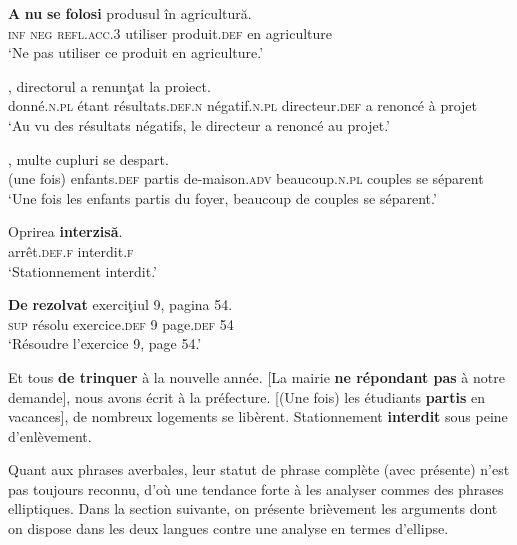 \ea
\ea
\gll   \textbf{A}  \textbf{nu} \textbf{se}  \textbf{folosi}  produsul  în  agricultură. \label{ch1:ex23a}\\
\textsc{inf} \textsc{neg}  \textsc{refl.acc.3}  utiliser  produit.\textsc{def}  en  agriculture  \\
\glt ‘Ne pas utiliser ce produit en agriculture.’ 

\ex
{},  directorul  a  renunţat  la  proiect. \label{ch1:ex23b}\\
donné.\textsc{n.pl}  étant  résultats.\textsc{def.n}  négatif.\textsc{n.pl}  directeur.\textsc{def}  a  renoncé  à  projet\\
\glt ‘Au vu des résultats négatifs, le directeur a renoncé au projet.’ 

\ex
{},  multe  cupluri  se  despart. \label{ch1:ex23c}\\
  (une  fois)  enfants.\textsc{def}  partis  de-maison.\textsc{adv}  beaucoup.\textsc{n.pl}  couples  se  séparent\\
\glt ‘Une fois les enfants partis du foyer, beaucoup de couples se séparent.’ 

\ex
\gll  Oprirea  \textbf{interzisă}. \label{ch1:ex23d} \\
  arrêt\textsc{.def.f}  interdit.\textsc{f} \\
\glt ‘Stationnement interdit.’ 

\ex
\gll  \textbf{De} \textbf{rezolvat}  exerciţiul  9,  pagina  54.  \label{ch1:ex23e} \\
\textsc{sup}  résolu\textsc{}  exercice.\textsc{def}  9  page.\textsc{def}  54 \\
\glt ‘Résoudre l’exercice 9, page 54.’ 
\z
\z


\ea
\ea  Et tous \textbf{de trinquer} à la nouvelle année.  \label{ch1:ex24a}
\ex{}  [La mairie \textbf{ne répondant pas} à notre demande], nous avons écrit à la préfecture.\label{ch1:ex24b}
\ex{} [(Une fois) les étudiants \textbf{partis} en vacances], de nombreux logements se libèrent.\label{ch1:ex24c}
\ex  Stationnement \textbf{interdit} sous peine d’enlèvement.\label{ch1:ex24d}
\z
\z

Quant aux phrases averbales, leur statut de phrase complète (avec  présente) n’est pas toujours reconnu, d’où une tendance forte à les analyser commes des phrases elliptiques. Dans la section suivante, on présente brièvement les arguments dont on dispose dans les deux langues contre une analyse en termes d’ellipse. 


